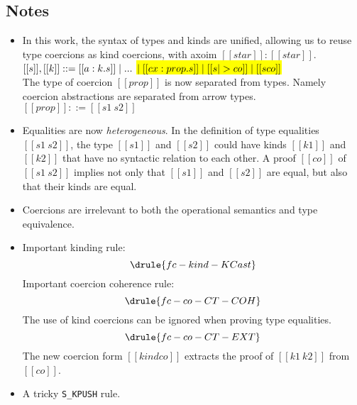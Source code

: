\subsection{Notes}

\begin{itemize}
\item In this work, the syntax of types and kinds are unified, allowing us to
  reuse type coercions as kind coercions, with axoim $[[ star ]] : [[star]]$.\\
  $[[s]], [[k]] ::= [[\/a : k . s]] \mid ...$ \hl{$\mid [[\/ cx : prop . s]] \mid [[s |> co]] \mid
    [[s co]]$}\\
  The type of coercion $[[prop]]$ is now separated from types. Namely 
  coercion abstractions are separated from arrow types.\\
  $[[prop]] ::= [[s1 ~ s2]]$
\item Equalities are now \textit{heterogeneous}. In the definition of type
  equalities $[[s1 ~ s2]]$, the type $[[s1]]$ and $[[s2]]$ could have kinds
  $[[k1]]$ and $[[k2]]$ that have no syntactic relation to each other. A proof
  $[[co]]$ of $[[s1 ~ s2]]$ implies not only that $[[s1]]$ and $[[s2]]$ are
  equal, but also that their kinds are equal.
\item Coercions are irrelevant to both the operational semantics and type equivalence.
\item Important kinding rule:
  \[ \drule{fc-kind-KCast} \]
  Important coercion coherence rule:
  \[ \drule{fc-co-CT-COH} \]
  The use of kind coercions can be ignored when proving type equalities.
  \[ \drule{fc-co-CT-EXT} \]
  The new coercion form $[[kind co]]$ extracts the
  proof of $[[k1 ~ k2]]$ from $[[co]]$.
\item A tricky \verb|S_KPUSH| rule.
\end{itemize}

